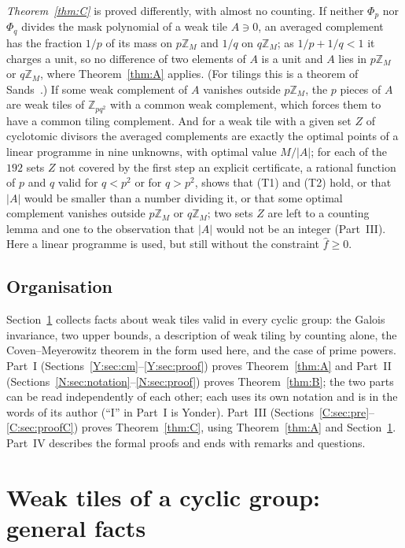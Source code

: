 \documentclass[11pt,a4paper]{amsart}
\theoremstyle{definition}
\theoremstyle{remark}
\newcommand{\Z}{\mathbb{Z}}
\begin{document}
\emph{Theorem~\ref{thm:C}} is proved differently, with almost no counting. If neither $\Phi_p$ nor $\Phi_q$
divides the mask polynomial of a weak tile $A\ni0$, an averaged complement has the fraction $1/p$ of its mass on
$p\Z_M$ and $1/q$ on $q\Z_M$; as $1/p+1/q<1$ it charges a unit, so no difference of two elements of $A$ is a
unit and $A$ lies in $p\Z_M$ or $q\Z_M$, where Theorem~\ref{thm:A} applies. (For tilings this is a theorem of
Sands~\cite{Sa}.) If some weak complement of $A$ vanishes outside $p\Z_M$, the $p$ pieces of $A$ are weak tiles
of $\Z_{pq^2}$ with a common weak complement, which forces them to have a common tiling complement. And for a
weak tile with a given set $Z$ of cyclotomic divisors the averaged complements are exactly the optimal points of
a linear programme in nine unknowns, with optimal value $M/|A|$; for each of the $192$ sets $Z$ not covered by
the first step an explicit certificate, a rational function of $p$ and $q$ valid for $q<p^2$ or for $q>p^2$,
shows that (T1) and (T2) hold, or that $|A|$ would be smaller than a number dividing it, or that some optimal
complement vanishes outside $p\Z_M$ or $q\Z_M$; two sets $Z$ are left to a counting lemma and one to the
observation that $|A|$ would not be an integer (Part~III). Here a linear programme is used, but still without
the constraint $\hat f\ge0$.

\subsection*{Organisation} Section~\ref{N:sec:general} collects facts about weak tiles valid in every cyclic
group: the Galois invariance, two upper bounds, a description of weak tiling by counting alone, the
Coven--Meyerowitz theorem in the form used here, and the case of prime powers. Part~I
(Sections~\ref{Y:sec:cm}--\ref{Y:sec:proof}) proves Theorem~\ref{thm:A} and Part~II
(Sections~\ref{N:sec:notation}--\ref{N:sec:proof}) proves Theorem~\ref{thm:B}; the two parts can be read
independently of each other; each uses its own notation and is in the words of its author (``I'' in Part~I
is Yonder). Part~III (Sections~\ref{C:sec:pre}--\ref{C:sec:proofC}) proves Theorem~\ref{thm:C}, using
Theorem~\ref{thm:A} and Section~\ref{N:sec:general}. Part~IV describes the formal proofs and ends with
remarks and questions.

\section{Weak tiles of a cyclic group: general facts}\label{N:sec:general}
\end{document}
